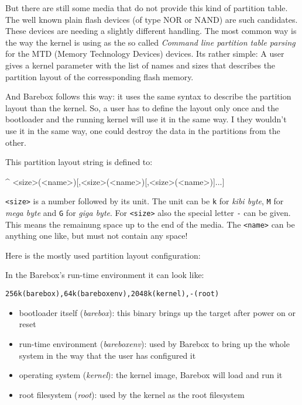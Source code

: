 But there are still some media that do not provide this kind of partition table.
The well known plain flash devices (of type NOR or NAND) are such candidates.
These devices are needing a slightly different handling. The most common way is
the way the kernel is using as the so called \textit{Command line partition
table parsing} for the MTD (Memory Technology Devices) devices. Its rather
simple: A user gives a kernel parameter with the list of names and sizes that
describes the partition layout of the corressponding flash memory.

%
%

And Barebox follows this way: it uses the same syntax to describe the partition
layout than the kernel. So, a user has to define the layout only once and the
bootloader and the running kernel will use it in the same way. I they wouldn't
use it in the same way, one could destroy the data in the partitions from the
other.

This partition layout string is defined to:

\begin{ptxshell}[escapechar=|]{^}
<size>(<name>)[,<size>(<name>)[,<size>(<name>)]...]
\end{ptxshell}

\texttt{<size>} is a number followed by its unit. The unit can be \texttt{k} for
\textit{kibi byte}, \texttt{M} for \textit{mega byte} and \texttt{G} for
\textit{giga byte}. For \texttt{<size>} also the special letter \texttt{-}
can be given. This means the remainung space up to the end of the media. The
\texttt{<name>} can be anything one like, but must not contain any space!

Here is the mostly used partition layout configuration:

In the Barebox's run-time environment it can look like:

\texttt{256k(barebox),64k(bareboxenv),2048k(kernel),-(root)}

\begin{itemize}
 \item bootloader itself (\textit{barebox}): this binary brings up the target
  after power on or reset
 \item run-time environment (\textit{bareboxenv}): used by Barebox to bring up
  the whole system in the way that the user has configured it
 \item operating system (\textit{kernel}): the kernel image, Barebox will load
  and run it
 \item root filesystem (\textit{root}): used by the kernel as the root
  filesystem
\end{itemize}


